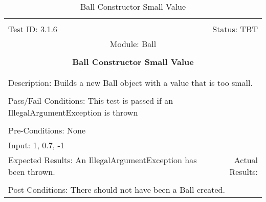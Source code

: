 \documentclass[titlepage]{article}
\begin{document}
\begin{center}%
\begin{table}
\begin{tabular}{|l r|}\hline&\\[-2mm]
	Test ID: 3.1.6	&Status: TBT\\[-3mm]
	\multicolumn{2}{|c|}{Module: Ball}\\&\\
	\multicolumn{2}{|c|}{\textbf{\large{Ball Constructor Small Value}}}\\&\\\hline&\\[-3mm]
	\multicolumn{2}{|p{\textwidth}|}{Description: Builds a new Ball object with a value that is too small.}\\[1mm]\hline&\\[-3mm]
	\multicolumn{2}{|p{\textwidth}|}{Pass/Fail Conditions: This test is passed if an IllegalArgumentException is thrown}\\[1mm]\hline&\\[-3mm]
	\multicolumn{2}{|p{\textwidth}|}{Pre-Conditions: None}\\[4mm]
	\multicolumn{2}{|p{\textwidth}|}{Input: 1, 0.7, -1}\\[2mm]\hline
	\multicolumn{1}{|p{0.49\textwidth}}{Expected Results: An IllegalArgumentException has been thrown.}	&\multicolumn{1}{|p{0.45\textwidth}|}{Actual Results:}\\\hline&\\[-3mm]
	\multicolumn{2}{|p{\textwidth}|}{Post-Conditions: There should not have been a Ball created.}\\\hline
\end{tabular}
\caption{Ball Constructor Small Value}
\end{table}
\end{center}
\end{document}
